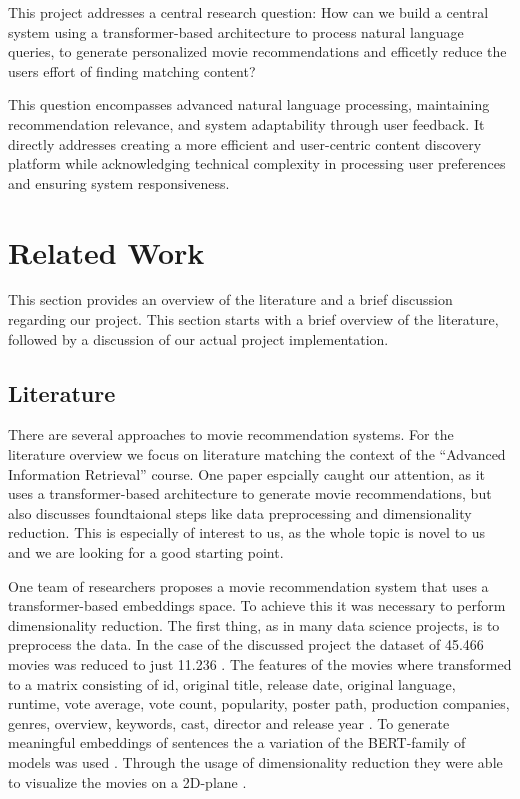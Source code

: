 \documentclass[12pt,a4paper]{article}
\begin{document}
  This project addresses a central research question:
  How can we build a central system using a transformer-based architecture to process natural language queries,
  to generate personalized movie recommendations and efficetly reduce the users effort of finding matching content?

  \noindent This question encompasses advanced natural language processing, maintaining recommendation relevance, and system
  adaptability through user feedback. It directly addresses creating a more efficient and user-centric content discovery
  platform while acknowledging technical complexity in processing user preferences and ensuring system responsiveness.


  \section{Related Work}

  This section provides an overview of the literature and a brief discussion regarding our project.
  This section starts with a brief overview of the literature, followed by a discussion of our actual project implementation.

  \subsection{Literature}

  There are several approaches to movie recommendation systems.
  For the literature overview we focus on literature matching the context of the ``Advanced Information Retrieval'' course.
  One paper espcially caught our attention, as it uses a transformer-based architecture to generate movie recommendations,
  but also discusses foundtaional steps like data preprocessing and dimensionality reduction.
  This is especially of interest to us, as the whole topic is novel to us and we are looking for a good starting point.

  \noindent One team of researchers \cite{Iglesias-pardo-lopez-quintero-2024} proposes a movie recommendation system that uses a
  transformer-based embeddings space. To achieve this it was necessary to perform dimensionality reduction.
  The first thing, as in many data science projects, is to preprocess the data.
  In the case of the discussed project the dataset of 45.466 movies was reduced to just 11.236 \cite{Iglesias-pardo-lopez-quintero-2024}.
  The features of the movies where transformed to a matrix consisting of id, original title, release date,
  original language, runtime, vote average, vote count, popularity, poster path, production companies, genres, overview,
  keywords, cast, director and release year \cite{Iglesias-pardo-lopez-quintero-2024}.
  To generate meaningful embeddings of sentences the a variation of the BERT-family of models was used \cite{Iglesias-pardo-lopez-quintero-2024}.
  Through the usage of dimensionality reduction they were able to visualize the movies on a 2D-plane \cite{Iglesias-pardo-lopez-quintero-2024}.
\end{document}
